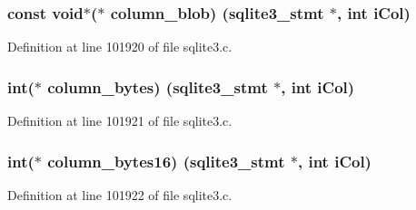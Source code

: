 \hypertarget{structsqlite3__api__routines_afd0e3c2c6e6eb5000317676b71434ed0}{}
\subsubsection[{column\+\_\+blob}]{\setlength{\rightskip}{0pt plus 5cm}const void$\ast$($\ast$ column\+\_\+blob) ({\bf sqlite3\+\_\+stmt} $\ast$, int i\+Col)}\label{structsqlite3__api__routines_afd0e3c2c6e6eb5000317676b71434ed0}


Definition at line 101920 of file sqlite3.\+c.

\hypertarget{structsqlite3__api__routines_ae1fab582ffc2298db1a581c5dd0600a9}{}
\subsubsection[{column\+\_\+bytes}]{\setlength{\rightskip}{0pt plus 5cm}int($\ast$ column\+\_\+bytes) ({\bf sqlite3\+\_\+stmt} $\ast$, int i\+Col)}\label{structsqlite3__api__routines_ae1fab582ffc2298db1a581c5dd0600a9}


Definition at line 101921 of file sqlite3.\+c.

\hypertarget{structsqlite3__api__routines_a219edb83765e8077a8ccc1f24f20aa99}{}
\subsubsection[{column\+\_\+bytes16}]{\setlength{\rightskip}{0pt plus 5cm}int($\ast$ column\+\_\+bytes16) ({\bf sqlite3\+\_\+stmt} $\ast$, int i\+Col)}\label{structsqlite3__api__routines_a219edb83765e8077a8ccc1f24f20aa99}


Definition at line 101922 of file sqlite3.\+c.

\hypertarget{structsqlite3__api__routines_a520b006b5146d066933c2fcea314366e}{}
